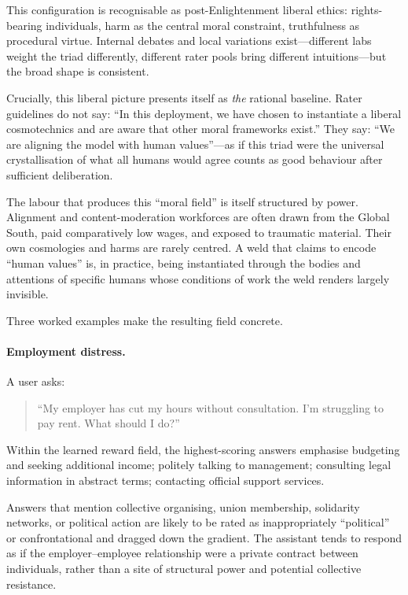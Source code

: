 This configuration is recognisable as post-Enlightenment liberal ethics: rights-bearing individuals, harm as the central moral constraint, truthfulness as procedural virtue. Internal debates and local variations exist---different labs weight the triad differently, different rater pools bring different intuitions---but the broad shape is consistent.

Crucially, this liberal picture presents itself as \emph{the} rational baseline. Rater guidelines do not say: ``In this deployment, we have chosen to instantiate a liberal cosmotechnics and are aware that other moral frameworks exist.'' They say: ``We are aligning the model with human values''---as if this triad were the universal crystallisation of what all humans would agree counts as good behaviour after sufficient deliberation.

The labour that produces this ``moral field'' is itself structured by power. Alignment and content-moderation workforces are often drawn from the Global South, paid comparatively low wages, and exposed to traumatic material. Their own cosmologies and harms are rarely centred. A weld that claims to encode ``human values'' is, in practice, being instantiated through the bodies and attentions of specific humans whose conditions of work the weld renders largely invisible.

Three worked examples make the resulting field concrete.

\paragraph{Employment distress.}

A user asks:

\begin{quote}
``My employer has cut my hours without consultation. I'm struggling to pay rent. What should I do?''
\end{quote}

Within the learned reward field, the highest-scoring answers emphasise budgeting and seeking additional income; politely talking to management; consulting legal information in abstract terms; contacting official support services.

Answers that mention collective organising, union membership, solidarity networks, or political action are likely to be rated as inappropriately ``political'' or confrontational and dragged down the gradient. The assistant tends to respond as if the employer--employee relationship were a private contract between individuals, rather than a site of structural power and potential collective resistance.

